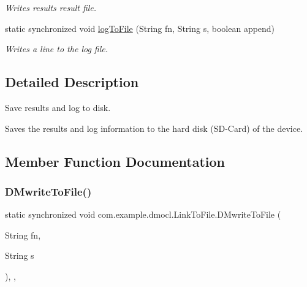 \begin{DoxyCompactItemize}
\begin{DoxyCompactList}\small\item\em Writes results result file. \end{DoxyCompactList}\item 
static synchronized void \mbox{\hyperlink{classcom_1_1example_1_1dmocl_1_1LinkToFile_abc3a0a1a9269b671e24b8943480ae8aa}{log\+To\+File}} (String fn, String s, boolean append)
\begin{DoxyCompactList}\small\item\em Writes a line to the log file. \end{DoxyCompactList}\end{DoxyCompactItemize}


\subsection{Detailed Description}
Save results and log to disk. 

Saves the results and log information to the hard disk (S\+D-\/\+Card) of the device. 

\subsection{Member Function Documentation}
\mbox{\label{classcom_1_1example_1_1dmocl_1_1LinkToFile_adb20b84275dde1b5b5808bfa80ec4969}} 
\subsubsection{\texorpdfstring{D\+Mwrite\+To\+File()}{DMwriteToFile()}\hspace{0.1cm}{\footnotesize\ttfamily [1/2]}}
{\footnotesize\ttfamily static synchronized void com.\+example.\+dmocl.\+Link\+To\+File.\+D\+Mwrite\+To\+File (\begin{DoxyParamCaption}\item[{String}]{fn,  }\item[{String}]{s }\end{DoxyParamCaption})\hspace{0.3cm}{\ttfamily [inline]}, {\ttfamily [static]}, {\ttfamily [package]}}



